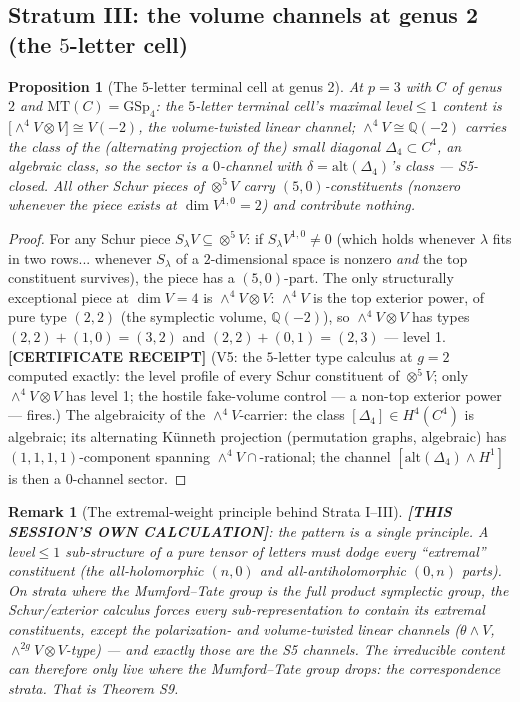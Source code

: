 \documentclass[11pt]{article}
\newtheorem{proposition}[theorem]{Proposition}
\newtheorem{remark}[theorem]{Remark}
\newcommand{\CERT}{\textbf{[CERTIFICATE RECEIPT]}}
\newcommand{\MINE}{\textbf{[THIS SESSION'S OWN CALCULATION]}}
\newcommand{\Q}{\mathbb{Q}}
\newcommand{\MT}{\mathrm{MT}}
\newcommand{\GSp}{\mathrm{GSp}}
\begin{document}
\subsection{Stratum III: the volume channels at genus 2 (the $5$-letter cell)}

\begin{proposition}[The $5$-letter terminal cell at genus 2]\label{prop:s8c}
At $p=3$ with $C$ of genus $2$ and $\MT(C)=\GSp_4$: the
$5$-letter terminal cell's maximal level${}\le1$ content is
$\bigl[\wedge^4V\otimes V\bigr]\cong V(-2)$, the volume-twisted linear
channel; $\wedge^4V\cong\Q(-2)$ carries the class of the (alternating
projection of the) small diagonal $\Delta_4\subset C^4$, an algebraic
class, so the sector is a $0$-channel with
$\delta=\mathrm{alt}(\Delta_4)$'s class --- S5-closed. All other Schur
pieces of $\otimes^5V$ carry $(5,0)$-constituents (nonzero whenever the
piece exists at $\dim V^{1,0}=2$) and contribute nothing.
\end{proposition}

\begin{proof}
For any Schur piece $S_\lambda V\subseteq\otimes^5V$: if
$S_\lambda V^{1,0}\ne0$ (which holds whenever $\lambda$ fits in two
rows... whenever $S_\lambda$ of a $2$-dimensional space is nonzero
\emph{and} the top constituent survives), the piece has a $(5,0)$-part.
The only structurally exceptional piece at $\dim V=4$ is
$\wedge^4V\otimes V$: $\wedge^4V$ is the top exterior power, of pure
type $(2,2)$ (the symplectic volume, $\Q(-2)$), so
$\wedge^4V\otimes V$ has types $(2,2)+(1,0)=(3,2)$ and
$(2,2)+(0,1)=(2,3)$ --- level 1. \CERT{} (V5: the $5$-letter type
calculus at $g=2$ computed exactly: the level profile of every Schur
constituent of $\otimes^5V$; only $\wedge^4V\otimes V$ has level 1; the
hostile fake-volume control --- a non-top exterior power --- fires.)
The algebraicity of the $\wedge^4V$-carrier: the class
$[\Delta_4]\in H^4(C^4)$ is algebraic; its alternating K\"unneth
projection (permutation graphs, algebraic) has $(1,1,1,1)$-component
spanning $\wedge^4V\cap$-rational; the channel
$[\mathrm{alt}(\Delta_4)\wedge H^1]$ is then a $0$-channel sector.
\end{proof}

\begin{remark}[The extremal-weight principle behind Strata I--III]
\MINE{}: the pattern is a single principle. A level${}\le1$
sub-structure of a pure tensor of letters must dodge every
``extremal'' constituent (the all-holomorphic $(n,0)$ and
all-antiholomorphic $(0,n)$ parts). On strata where the Mumford--Tate
group is the full product symplectic group, the Schur/exterior calculus
forces every sub-representation to contain its extremal constituents,
\emph{except} the polarization- and volume-twisted linear channels
($\theta\wedge V$, $\wedge^{2g}V\otimes V$-type) --- and exactly those
are the S5 channels. The irreducible content can therefore only live
where the Mumford--Tate group \emph{drops}: the correspondence strata.
That is Theorem S9.
\end{remark}
\end{document}
